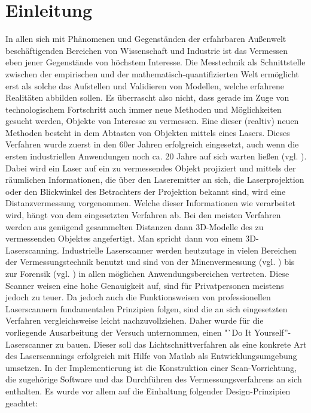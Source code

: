 \chapter{Einleitung}
In allen sich mit Phänomenen und Gegenständen der erfahrbaren Außenwelt beschäftigenden Bereichen von Wissenschaft und Industrie ist das Vermessen eben jener Gegenstände von höchstem Interesse. Die Messtechnik als Schnittstelle zwischen der empirischen und der mathematisch-quantifizierten Welt ermöglicht erst als solche das Aufstellen und Validieren von Modellen, welche erfahrene Realitäten abbilden sollen. Es überrascht also nicht, dass gerade im Zuge von technologischem Fortschritt auch immer neue Methoden und Möglichkeiten gesucht werden, Objekte von Interesse zu vermessen. \newline
Eine dieser (realtiv) neuen Methoden besteht in dem Abtasten von Objekten mittels eines Lasers. Dieses Verfahren wurde zuerst in den 60er Jahren erfolgreich eingesetzt, auch wenn die ersten industriellen Anwendungen noch ca. 20 Jahre auf sich warten ließen (vgl. \cite{Ebrahim:11}). Dabei wird ein Laser auf ein zu vermessendes Objekt projiziert und mittels der räumlichen Informationen, die über den Laseremitter an sich, die Laserprojektion oder den Blickwinkel des Betrachters der Projektion bekannt sind, wird eine Distanzvermessung vorgenommen. Welche dieser Informationen wie verarbeitet wird, hängt von dem eingesetzten Verfahren ab. Bei den meisten Verfahren werden aus genügend gesammelten Distanzen dann 3D-Modelle des zu vermessenden Objektes angefertigt. Man spricht dann von einem 3D-Laserscanning. \newline
Industrielle Laserscanner werden heutzutage in vielen Bereichen der Vermessungstechnik benutzt und sind von der Minenvermessung (vgl. \cite{riegl:17}) bis zur Forensik (vgl. \cite{Zoller:16}) in allen möglichen Anwendungsbereichen vertreten. Diese Scanner weisen eine hohe Genauigkeit auf, sind für Privatpersonen meistens jedoch zu teuer. Da jedoch auch die Funktionsweisen von professionellen Laserscannern fundamentalen Prinzipien folgen, sind die an sich eingesetzten Verfahren vergleichsweise leicht nachzuvollziehen. Daher wurde für die vorliegende Ausarbeitung der Versuch unternommen, einen "`Do It Yourself''-Laserscanner zu bauen. Dieser soll das Lichtschnittverfahren als eine konkrete Art des Laserscannings erfolgreich mit Hilfe von Matlab als Entwicklungsumgebung umsetzen. In der Implementierung ist die Konstruktion einer Scan-Vorrichtung, die zugehörige Software und das Durchführen des Vermessungsverfahrens an sich enthalten. Es wurde vor allem auf die Einhaltung folgender Design-Prinzipien geachtet:
